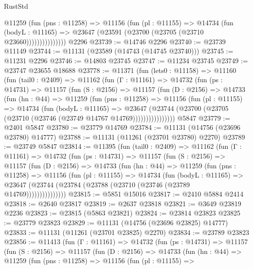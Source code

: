 \begin{lexlean}{RustStd}
\begin{coremodule}
                  @11259
                    (fun (pns : @11258) =>
                    @11156
                      (fun (pl : @11155) =>
                      @14734
                        (fun (bodyL : @11165) =>
                        @23647 (@23591 (@23700 (@23705 (@23710 @23660)))))))))))))))
    @2296
@23739 := @14746 @2296
@23740 := @23739 @11149
@23744 := @11131 (@23589 (@14743 (@14745 @23740)))
@23745 := @11231 @2296
@23746 := @14803 @23745
@23747 := @11234 @23745
@23749 := @23747 @23655 @18688
@23778 := @11371
    (fun (lets0 : @11158) =>
    @11160
      (fun (tail0 : @2409) =>
      @11162
        (fun (Γ : @11161) =>
        @14732
          (fun (ps : @14731) =>
          @11157
            (fun (S : @2156) =>
            @11157
              (fun (D : @2156) =>
              @14733
                (fun (hn : @44) =>
                @11259
                  (fun (pns : @11258) =>
                  @11156
                    (fun (pl : @11155) =>
                    @14734
                      (fun (bodyL : @11165) =>
                      @23647
                        (@23744
                          (@23700 (@23705 (@23710 (@23746 (@23749 @14767 @14769))))))))))))))))
    @5847
@23779 := @2401 @5847
@23780 := @23779 @14769
@23784 := @11131 (@14756 (@23696 @23780) @14777)
@23788 := @11131 (@11261 (@23701 @23780) @2270)
@23789 := @23749 @5847
@23814 := @11395
    (fun (tail0 : @2409) =>
    @11162
      (fun (Γ : @11161) =>
      @14732
        (fun (ps : @14731) =>
        @11157
          (fun (S : @2156) =>
          @11157
            (fun (D : @2156) =>
            @14733
              (fun (hn : @44) =>
              @11259
                (fun (pns : @11258) =>
                @11156
                  (fun (pl : @11155) =>
                  @14734
                    (fun (bodyL : @11165) =>
                    @23647 (@23744 (@23784 (@23788 (@23710 (@23746 (@23789 @14769)))))))))))))))
@23815 := @5851 @15016
@23817 := @2410 @5884 @2414
@23818 := @2640 @23817
@23819 := @2637 @23818
@23821 := @3649 @23819 @2236
@23823 := @23815 (@5863 @23821)
@23824 := @23814 @23823
@23825 := @23779 @23823
@23829 := @11131 (@14756 (@23696 @23825) @14777)
@23833 := @11131 (@11261 (@23701 @23825) @2270)
@23834 := @23789 @23823
@23856 := @11413
    (fun (Γ : @11161) =>
    @14732
      (fun (ps : @14731) =>
      @11157
        (fun (S : @2156) =>
        @11157
          (fun (D : @2156) =>
          @14733
            (fun (hn : @44) =>
            @11259
              (fun (pns : @11258) =>
              @11156
                (fun (pl : @11155) =>

\end{coremodule}
\end{lexlean}
